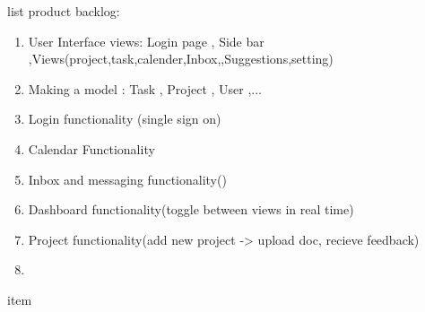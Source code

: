 list product backlog:

\begin{enumerate}
	\item User Interface views: Login page , Side bar ,Views(project,task,calender,Inbox,,Suggestions,setting) 
	\item Making a model : Task , Project , User ,...
	\item Login functionality (single sign on)
	\item Calendar Functionality
	\item Inbox and messaging functionality()
	\item Dashboard functionality(toggle between views in real time)
	\item Project functionality(add new project -> upload doc, recieve feedback)
	\item 
\end{enumerate}

\begin{enumerate}
	item 
\end{enumerate}
